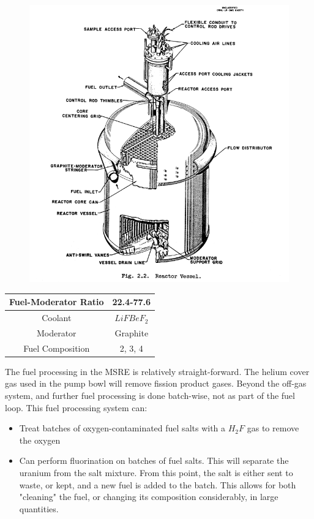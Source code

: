 \documentclass[letterpaper]{article}
\begin{document}
\begin{figure}[H]
  \centering
  \includegraphics[width=1.0\linewidth]{figures/MSREsource2.png}
  \label{fig:fig2}
\end{figure}


\begin{center}
\begin{tabular}{|c|c|}
\hline
Fuel-Moderator Ratio & 22.4-77.6 \\
\hline
Coolant & $LiFBeF_2$ \\
\hline
Moderator & Graphite \\
\hline
Fuel Composition & 2, 3, 4 \\
\hline
\end{tabular}
\end{center}

The fuel processing in the MSRE is relatively straight-forward.  The helium cover gas used in the pump bowl will remove fission product gases.  Beyond the off-gas system, and further fuel processing is done batch-wise, not as part of the fuel loop.  This fuel processing system can:

\begin{itemize}
\item Treat batches of oxygen-contaminated fuel salts with a $H_2F$ gas to remove the oxygen
\item Can perform fluorination on batches of fuel salts.  This will separate the uranium from the salt mixture.  From this point, the salt is either sent to waste, or kept, and a new fuel is added to the batch.  This allows for both "cleaning" the fuel, or changing its composition considerably, in large quantities.
\end{itemize}
\end{document}
